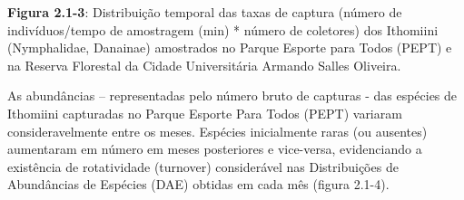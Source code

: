 \textbf{Figura 2.1-3}: Distribuição temporal das taxas de captura (número de indivíduos/tempo de amostragem (min) * número de coletores) dos Ithomiini (Nymphalidae, Danainae) amostrados no Parque Esporte para Todos (PEPT) e na Reserva Florestal da Cidade Universitária Armando Salles Oliveira.

As abundâncias – representadas pelo número bruto de capturas - das espécies de Ithomiini capturadas no Parque Esporte Para Todos (PEPT) variaram consideravelmente entre os meses. Espécies inicialmente raras (ou ausentes) aumentaram em número em meses posteriores e vice-versa, evidenciando a existência de rotatividade (turnover) considerável nas Distribuições de Abundâncias de Espécies (DAE) obtidas em cada mês (figura 2.1-4).  

